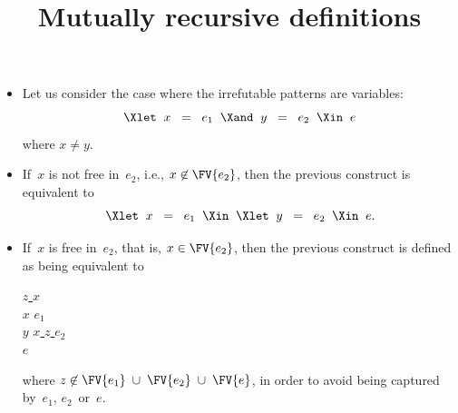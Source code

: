 \documentclass[wide]{slides}
\begin{document}
\begin{slide}
  \title{Mutually recursive definitions}

  \begin{itemize}

    \item Let us consider the case where the irrefutable patterns are
      variables:
      \begin{equation*}
        \Xlet \;\; x \;\; = \;\; e_1 \;\; \Xand \;\; y \;\; = \;\; e_2
        \;\; \Xin \;\; e
      \end{equation*}
      where $x \neq y$.

    \item If~\(x\) is not free in~\(e_2\), i.e., $x \not\in
      \FV{e_2}$, then the previous construct is equivalent to \[\Xlet
      \;\; x \;\; = \;\; e_1 \;\; \Xin \;\; \Xlet \;\; y \;\; = \;\;
      e_2 \;\; \Xin \;\; e.\]

    \item If~\(x\) is free in~\(e_2\), that is, $x \in \FV{e_2}$, then
      the previous construct is defined as being equivalent to
      \begin{center}
        \begin{minipage}{0.3\linewidth}
          \begin{tabbing}
            \underline{\Xlet} \= \underline{$z$ \equal{} $x$ \Xin}\\
            \> \Xlet{} $x$ \equal{} $e_1$ \Xin\\
            \> \Xlet{} $y$ \equal{} \underline{\Xlet{} $x$ \equal{}
              $z$ \Xin} $e_2$\\
            \Xin $e$
          \end{tabbing}
        \end{minipage}
      \end{center}
      where \(z \not\in \FV{e_1} \;\cup\; \FV{e_2} \;\cup\; \FV{e}\),
      in order to avoid being captured by~\(e_1\), \(e_2\)~or~\(e\).


  \end{itemize}

\end{slide}
\end{document}
